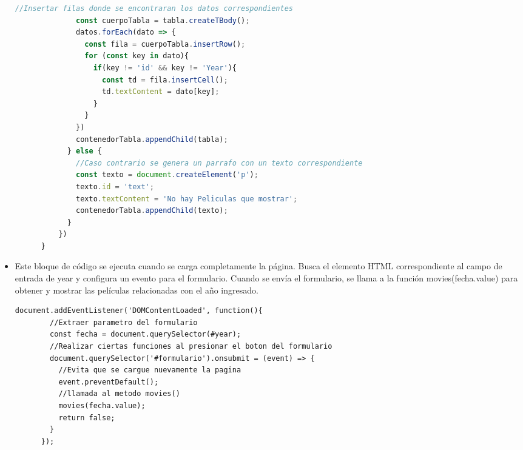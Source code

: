 \documentclass{article}
\begin{document}
\begin{itemize}
\begin{lstlisting}[language=JavaScript,caption=function movies()]
              //Insertar filas donde se encontraran los datos correspondientes
              const cuerpoTabla = tabla.createTBody();
              datos.forEach(dato => {
                const fila = cuerpoTabla.insertRow();
                for (const key in dato){
                  if(key != 'id' && key != 'Year'){
                    const td = fila.insertCell();
                    td.textContent = dato[key];
                  }
                }
              })
              contenedorTabla.appendChild(tabla);
            } else {
              //Caso contrario se genera un parrafo con un texto correspondiente
              const texto = document.createElement('p');
              texto.id = 'text';
              texto.textContent = 'No hay Peliculas que mostrar';
              contenedorTabla.appendChild(texto);
            }
          })
      }
    \end{lstlisting}
    \item Este bloque de código se ejecuta cuando se carga completamente la página. Busca el elemento HTML 
      correspondiente al campo de entrada de year y configura un evento para el formulario. 
      Cuando se envía el formulario, se llama a la función movies(fecha.value) para obtener y mostrar las 
      películas relacionadas con el año ingresado.
    \begin{lstlisting}[language=HTML,caption=Evento,firstnumber=62]
      document.addEventListener('DOMContentLoaded', function(){
        //Extraer parametro del formulario
        const fecha = document.querySelector(#year);
        //Realizar ciertas funciones al presionar el boton del formulario
        document.querySelector('#formulario').onsubmit = (event) => {
          //Evita que se cargue nuevamente la pagina
          event.preventDefault();
          //llamada al metodo movies()
          movies(fecha.value);
          return false;
        }
      });
    \end{lstlisting}
  \end{itemize}

\end{document}
